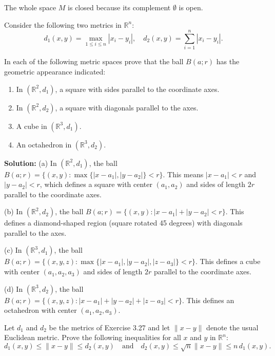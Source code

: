 The whole space $M$ is closed because its complement $\emptyset$ is open.

\begin{problembox}
Consider the following two metrics in \( \mathbb{R}^n \):
\[d_1(x, y) = \max_{1 \leq i \leq n} |x_i - y_i|, \quad d_2(x, y) = \sum_{i=1}^n |x_i - y_i|.\]

In each of the following metric spaces prove that the ball \( B(a; r) \) has the geometric appearance indicated:
\begin{enumerate}[label=\alph*)]
\item In \( (\mathbb{R}^2, d_1) \), a square with sides parallel to the coordinate axes.
\item In \( (\mathbb{R}^2, d_2) \), a square with diagonals parallel to the axes.
\item A cube in \( (\mathbb{R}^3, d_1) \).
\item An octahedron in \( (\mathbb{R}^3, d_2) \).
\end{enumerate}
\end{problembox}

\textbf{Solution:} 
(a) In $(\mathbb{R}^2, d_1)$, the ball $B(a;r) = \{(x,y) : \max\{|x-a_1|, |y-a_2|\} < r\}$. This means $|x-a_1| < r$ and $|y-a_2| < r$, which defines a square with center $(a_1,a_2)$ and sides of length $2r$ parallel to the coordinate axes.

(b) In $(\mathbb{R}^2, d_2)$, the ball $B(a;r) = \{(x,y) : |x-a_1| + |y-a_2| < r\}$. This defines a diamond-shaped region (square rotated 45 degrees) with diagonals parallel to the axes.

(c) In $(\mathbb{R}^3, d_1)$, the ball $B(a;r) = \{(x,y,z) : \max\{|x-a_1|, |y-a_2|, |z-a_3|\} < r\}$. This defines a cube with center $(a_1,a_2,a_3)$ and sides of length $2r$ parallel to the coordinate axes.

(d) In $(\mathbb{R}^3, d_2)$, the ball $B(a;r) = \{(x,y,z) : |x-a_1| + |y-a_2| + |z-a_3| < r\}$. This defines an octahedron with center $(a_1,a_2,a_3)$.

\begin{problembox}
Let \( d_1 \) and \( d_2 \) be the metrics of Exercise 3.27 and let \( \|x - y\| \) denote the usual Euclidean metric. Prove the following inequalities for all \( x \) and \( y \) in \( \mathbb{R}^n \):
\[d_1(x, y) \leq \|x - y\| \leq d_2(x, y) \quad \text{and} \quad d_2(x, y) \leq \sqrt{n} \|x - y\| \leq n\,d_1(x, y).\]
\end{problembox}

